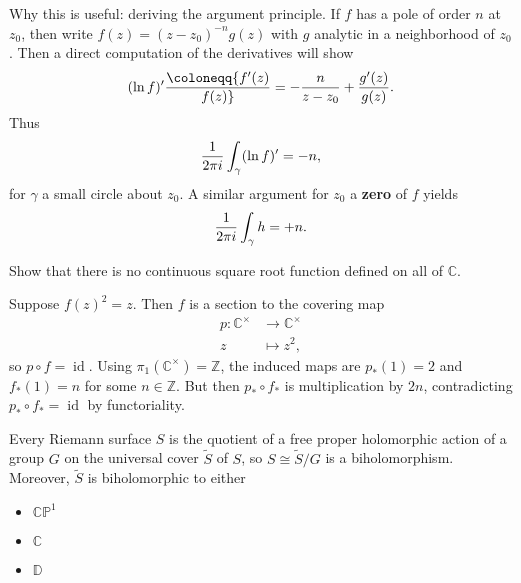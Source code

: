 \begin{remark}

Why this is useful: deriving the argument principle. If \(f\) has a pole
of order \(n\) at \(z_0\), then write \(f(z) = (z-z_0)^{-n} g(z)\) with
\(g\) analytic in a neighborhood of \(z_0\). Then a direct computation
of the derivatives will show
\begin{align*}
(\ln f)' \coloneqq{f'(z) \over f(z)} = -{n\over z-z_0} + {g'(z) \over g(z)}
.\end{align*}
Thus
\begin{align*}
{1\over 2\pi i } \int_\gamma (\ln f)' = -n
,\end{align*}
for \(\gamma\) a small circle about \(z_0\). A similar argument for
\(z_0\) a \textbf{zero} of \(f\) yields
\begin{align*}
{1\over 2\pi i } \int_\gamma h = +n
.\end{align*}

\end{remark}

\begin{exercise}[?]

Show that there is no continuous square root function defined on all of
\({\mathbb{C}}\).

\end{exercise}

\begin{solution}

Suppose \(f(z)^2 = z\). Then \(f\) is a section to the covering map
\begin{align*}
p: {\mathbb{C}}^{\times}&\to {\mathbb{C}}^{\times}\\
z & \mapsto z^2
,\end{align*}
so \(p\circ f = \operatorname{id}\). Using
\(\pi_1({\mathbb{C}}^{\times}) = {\mathbb{Z}}\), the induced maps are
\(p_*(1) = 2\) and \(f_*(1) = n\) for some \(n\in {\mathbb{Z}}\). But
then \(p_* \circ f_*\) is multiplication by \(2n\), contradicting
\(p_* \circ f_* = \operatorname{id}\) by functoriality.

\end{solution}

\begin{theorem}[Uniformization]

Every Riemann surface \(S\) is the quotient of a free proper holomorphic
action of a group \(G\) on the universal cover \(\tilde S\) of \(S\), so
\(S\cong \tilde S/G\) is a biholomorphism. Moreover, \(\tilde S\) is
biholomorphic to either

\begin{itemize}
\tightlist
\item
  \({\mathbb{CP}}^1\)
\item
  \({\mathbb{C}}\)
\item
  \({\mathbb{D}}\)
\end{itemize}

\end{theorem}

